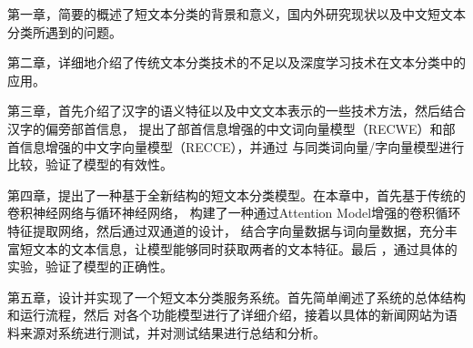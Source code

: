 第一章，简要的概述了短文本分类的背景和意义，国内外研究现状以及中文短文本分类所遇到的问题。

第二章，详细地介绍了传统文本分类技术的不足以及深度学习技术在文本分类中的应用。

第三章，首先介绍了汉字的语义特征以及中文文本表示的一些技术方法，然后结合汉字的偏旁部首信息，
提出了部首信息增强的中文词向量模型（RECWE）和部首信息增强的中文字向量模型（RECCE），并通过
与同类词向量/字向量模型进行比较，验证了模型的有效性。

第四章，提出了一种基于全新结构的短文本分类模型。在本章中，首先基于传统的卷积神经网络与循环神经网络，
构建了一种通过Attention Model增强的卷积循环特征提取网络，然后通过双通道的设计，
结合字向量数据与词向量数据，充分丰富短文本的文本信息，让模型能够同时获取两者的文本特征。最后
，通过具体的实验，验证了模型的正确性。

第五章，设计并实现了一个短文本分类服务系统。首先简单阐述了系统的总体结构和运行流程，然后
对各个功能模型进行了详细介绍，接着以具体的新闻网站为语料来源对系统进行测试，并对测试结果进行总结和分析。